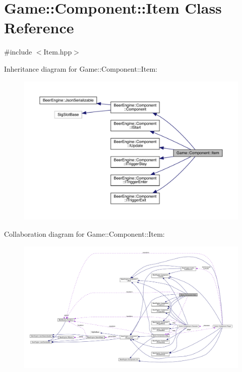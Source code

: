 \hypertarget{class_game_1_1_component_1_1_item}{}\section{Game\+:\+:Component\+:\+:Item Class Reference}
\label{class_game_1_1_component_1_1_item}


{\ttfamily \#include $<$Item.\+hpp$>$}



Inheritance diagram for Game\+:\+:Component\+:\+:Item\+:
\nopagebreak
\begin{figure}[H]
\begin{center}
\leavevmode
\includegraphics[width=350pt]{class_game_1_1_component_1_1_item__inherit__graph}
\end{center}
\end{figure}


Collaboration diagram for Game\+:\+:Component\+:\+:Item\+:
\nopagebreak
\begin{figure}[H]
\begin{center}
\leavevmode
\includegraphics[width=350pt]{class_game_1_1_component_1_1_item__coll__graph}
\end{center}
\end{figure}
